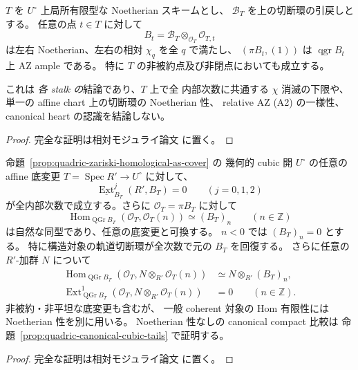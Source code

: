 \begin{corollary}
\label{cor:quadric-local-AZ-on-all-stalks}
$T$ を $U^\circ$ 上局所有限型な Noetherian スキームとし、
$\mathcal B_T$ を上の切断環の引戻しとする。
任意の点 $t\in T$ に対して
\[
 B_t=\mathcal B_T\otimes_{\mathcal O_T}
                 \mathcal O_{T,t}
\]
は左右 Noetherian、左右の相対 $\chi_q$ を全 $q$ で満たし、
$(\pi B_t,(1))$ は $\operatorname{qgr}B_t$ 上 AZ ample である。
特に $T$ の非被約点及び非閉点においても成立する。

これは \emph{各 stalk の}結論であり、$T$ 上で全
内部次数に共通する $\chi$ 消滅の下限や、
単一の affine chart 上の切断環の Noetherian 性、
relative AZ (A2) の一様性、
canonical heart の認識を結論しない。
\end{corollary}
\begin{proof}
完全な証明は相対モジュライ論文 \cite[\texttt{artin_roots}]{QuadricModuli2026} に置く。
\end{proof}



\begin{corollary}
\label{cor:quadric-all-basechange-saturated-sections}
命題~\ref{prop:quadric-zariski-homological-as-cover} の
幾何的 cubic 開 $U^\circ$ の任意の affine 底変更
$T=\operatorname{Spec}R'\to U^\circ$ に対して、
\[
 \underline{\operatorname{Ext}}_{B_T}^j(R',B_T)=0
 \qquad(j=0,1,2)
\]
が全内部次数で成立する。さらに $\mathcal O_T=\pi B_T$ に対して
\[
 \operatorname{Hom}_{\operatorname{QGr}B_T}
       (\mathcal O_T,\mathcal O_T(n))
 \simeq (B_T)_n\qquad(n\in\mathbb Z)
 \tag{Quadric-H0}\label{eq:quadric-relative-full-sections}
\]
は自然な同型であり、任意の底変更と可換する。
$n<0$ では $(B_T)_n=0$ とする。
特に構造対象の軌道切断環が全次数で元の $B_T$ を回復する。
さらに任意の $R'$-加群 $N$ について
\begin{align*}
 \operatorname{Hom}_{\operatorname{QGr}B_T}
   (\mathcal O_T,N\otimes_{R'}\mathcal O_T(n))
   &\simeq N\otimes_{R'}(B_T)_n,\\
 \operatorname{Ext}^1_{\operatorname{QGr}B_T}
   (\mathcal O_T,N\otimes_{R'}\mathcal O_T(n))&=0
 \qquad(n\in\mathbb Z).
\end{align*}
非被約・非平坦な底変更も含むが、
一般 coherent 対象の Hom 有限性には Noetherian 性を別に用いる。
Noetherian 性なしの canonical compact 比較は
命題~\ref{prop:quadric-canonical-cubic-tails} で証明する。
\end{corollary}
\begin{proof}
完全な証明は相対モジュライ論文 \cite[\texttt{artin_roots}]{QuadricModuli2026} に置く。
\end{proof}

